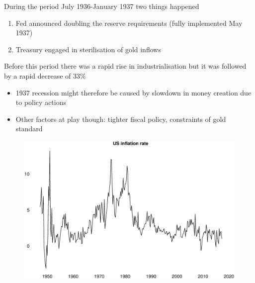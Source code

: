 \documentclass{beamer}
\begin{document}
\begin{frame}
 During the period July 1936-January 1937 two things happened
 \medskip
 \begin{enumerate}
   \item Fed announced doubling the reserve requirements (fully implemented May 1937)
   \item Treasury engaged in sterilisation of gold inflows
 \end{enumerate}
 \medskip
 Before this period there was a rapid rise in industrialisation but it was followed by a rapid decrease of 33\%
 \begin{itemize}
   \item 1937 recession might therefore be caused by slowdown in money creation due to policy actions
   \item Other factors at play though: tighter fiscal policy, constraints of gold standard
 \end{itemize}  
\end{frame}


\begin{frame}
  \begin{figure}
    \includegraphics[scale=.29]{inflation.eps}
  \end{figure}
\end{frame}
\end{document}
